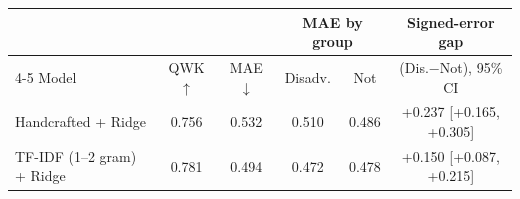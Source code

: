 \begin{tabular}{lccccc}
\toprule
 & & & \multicolumn{2}{c}{MAE by group} & Signed-error gap \\
\cmidrule(lr){4-5}
Model & QWK $\uparrow$ & MAE $\downarrow$ & Disadv. & Not & (Dis.$-$Not), 95\% CI \\
\midrule
Handcrafted + Ridge & 0.756 & 0.532 & 0.510 & 0.486 & +0.237 [+0.165, +0.305] \\
TF-IDF (1--2 gram) + Ridge & 0.781 & 0.494 & 0.472 & 0.478 & +0.150 [+0.087, +0.215] \\
\bottomrule
\end{tabular}
